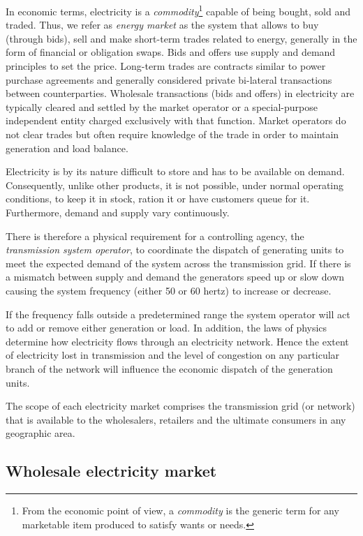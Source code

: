 \documentclass[11pt, twoside, titlepage, a4paper, openright]{report}
\begin{document}
In economic terms, electricity is a \textit{commodity}\footnote{From the economic point of view, a \textit{commodity} is the generic term for any marketable item produced to satisfy wants or needs.} capable of being bought, sold and traded. Thus, we refer as \textit{energy market} as the system that allows to buy (through bids), sell and make short-term trades related to energy, generally in the form of financial or obligation swaps. Bids and offers use supply and demand principles to set the price. Long-term trades are contracts similar to power purchase agreements and generally considered private bi-lateral transactions between counterparties.
Wholesale transactions (bids and offers) in electricity are typically cleared and settled by the market operator or a special-purpose independent entity charged exclusively with that function. Market operators do not clear trades but often require knowledge of the trade in order to maintain generation and load balance.

Electricity is by its nature difficult to store and has to be available on demand. Consequently, unlike other products, it is not possible, under normal operating conditions, to keep it in stock, ration it or have customers queue for it. Furthermore, demand and supply vary continuously.

There is therefore a physical requirement for a controlling agency, the \textit{transmission system operator}, to coordinate the dispatch of generating units to meet the expected demand of the system across the transmission grid. If there is a mismatch between supply and demand the generators speed up or slow down causing the system frequency (either 50 or 60 hertz) to increase or decrease. 

\noindent If the frequency falls outside a predetermined range the system operator will act to add or remove either generation or load.
In addition, the laws of physics determine how electricity flows through an electricity network. Hence the extent of electricity lost in transmission and the level of congestion on any particular branch of the network will influence the economic dispatch of the generation units.

The scope of each electricity market comprises the transmission grid (or network) that is available to the wholesalers, retailers and the ultimate consumers in any geographic area.

\subsection{Wholesale electricity market}\label{sec:wholesale}
\end{document}
